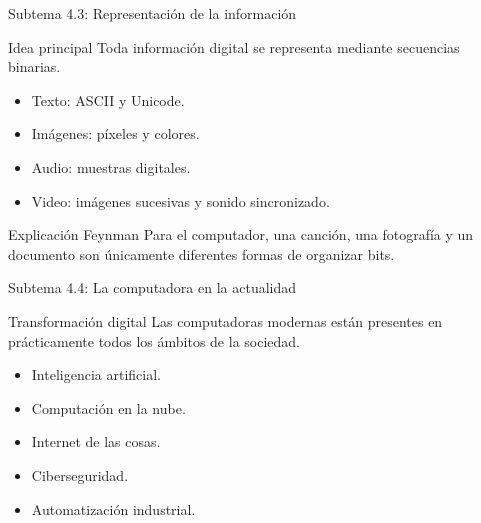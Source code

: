 \documentclass[10pt,aspectratio=169]{beamer}
\begin{document}
	
	\begin{frame}{Subtema 4.3: Representación de la información}
		
		\begin{block}{Idea principal}
			Toda información digital se representa mediante secuencias binarias.
		\end{block}
		
		\begin{itemize}
			\item Texto: ASCII y Unicode.
			\item Imágenes: píxeles y colores.
			\item Audio: muestras digitales.
			\item Video: imágenes sucesivas y sonido sincronizado.
		\end{itemize}
		
		\begin{block}{Explicación Feynman}
			Para el computador, una canción, una fotografía y un documento son únicamente diferentes formas de organizar bits.
		\end{block}
		
	\end{frame}
	
	
	\begin{frame}{Subtema 4.4: La computadora en la actualidad}
		
		\small
		
		\begin{block}{Transformación digital}
			Las computadoras modernas están presentes en prácticamente todos los ámbitos de la sociedad.
		\end{block}
		
		\begin{itemize}
			\item Inteligencia artificial.
			\item Computación en la nube.
			\item Internet de las cosas.
			\item Ciberseguridad.
			\item Automatización industrial.
		\end{itemize}
		
	\end{frame}
	
\end{document}

